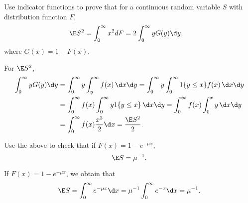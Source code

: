 \begin{question}
 Use indicator functions to prove that for  a continuous random
    variable $S$ with distribution function $F$, 
\begin{align*}
    \E S^2 &= \int_0^\infty x^2 dF  = 2 \int_0^\infty y G(y) \d y,
\end{align*}
where $G(x) = 1 - F(x)$. 
\begin{solution}
 For $\E S^2$, 
  \begin{equation*}
    \begin{split}
\int_0^\infty y G(y) \d y 
&=  \int_0^\infty y \int_y^\infty f(x)\, \d x \d y =  \int_0^\infty y \int_0^\infty 1\{y\leq x\}f(x)\, \d x \d y\\
&=  \int_0^\infty f(x) \int_0^\infty y 1\{y \leq x\}\, \d x \d y
=  \int_0^\infty f(x) \int_0^x y\, \d x \d y\\
&=  \int_0^\infty f(x) \frac{x^2}2 \d x =\frac{\E S^2}2.
    \end{split}
  \end{equation*}
\end{solution}
\end{question}


\begin{question}
 Use the above to check that if $F(x) = 1 - e^{-\mu x}$,
\begin{equation*}
  \E S = \mu^{-1}.
\end{equation*}
\begin{solution}
If $F(x) = 1 - e^{-\mu x}$, we obtain that 
\begin{equation*}
  \E S = \int_0^\infty e^{-\mu x} \d x =
  \mu^{-1}\int_0^\infty e^{-x} \d x = \mu^{-1}.
\end{equation*}
\end{solution}
\end{question}

